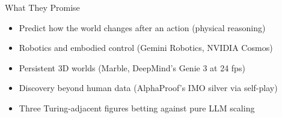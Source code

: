 \documentclass[aspectratio=169]{beamer}
\begin{document}
\begin{frame}{What They Promise}
    \begin{itemize}
        \item Predict how the world changes after an action (physical reasoning)
        \vspace{0.5em}
        \item Robotics and embodied control (Gemini Robotics, NVIDIA Cosmos)
        \vspace{0.5em}
        \item Persistent 3D worlds (Marble, DeepMind's Genie 3 at 24 fps)
        \vspace{0.5em}
        \item Discovery beyond human data (AlphaProof's IMO silver via self-play)
        \vspace{0.5em}
        \item Three Turing-adjacent figures betting against pure LLM scaling
    \end{itemize}
\end{frame}
\end{document}
